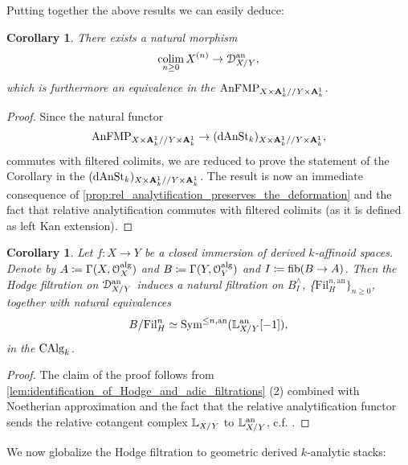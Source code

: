 \documentclass[10pt,a4paper,reqno]{amsart} %
\theoremstyle{plain}
\newtheorem{cor}[thm]{Corollary}
\theoremstyle{definition}
\theoremstyle{remark}
\numberwithin{equation}{section}
\begin{document}
Putting together the above results we can easily deduce:

\begin{cor} \label{cor:Hodge_filtration_in_the_non-archimedean_setting}
    There exists a natural morphism
        \[
            \operatorname*{colim}_{n \ge 0} X^{(n)} \to \mathcal D^\mathrm{an}_{X/ Y},  
        \]
    which is furthermore an equivalence in the \infcat $\mathrm{AnFMP}_{X \times \mathbf A^1_k/ /Y \times \mathbf A^1_k}$.
\end{cor}

\begin{proof}
    Since the natural functor
        \[
            \mathrm{AnFMP}_{X \times \mathbf A^1_k/ /Y \times \mathbf A^1_k} \to (\mathrm{dAnSt}_k)_{X \times \mathbf A^1_k/ /Y \times \mathbf A^1_k},
        \]
    commutes with filtered colimits, we are reduced to prove the statement of the Corollary in the \infcat $(\mathrm{dAnSt}_k)_{X \times \mathbf A^1_k/ /Y \times \mathbf A^1_k}$.
    The result is now an immediate consequence of \cref{prop:rel_analytification_preserves_the_deformation}
    and the fact that relative analytification commutes with filtered colimits (as it is defined as left Kan extension).
\end{proof}

\begin{cor}
    Let $f \colon X \to Y$ be a closed immersion of derived $k$-affinoid spaces. Denote by $A \coloneqq \Gamma(X, \mathcal O_X^\mathrm{alg})$
    and $B \coloneqq \Gamma(Y, \mathcal O_Y^\mathrm{alg})$ and $I \coloneqq \mathrm{fib}(B \to A)$. Then the Hodge filtration on $\mathcal D_{X/ Y}^\mathrm{an}$
    induces a natural filtration on $B^\wedge_I$, \{$\mathrm{Fil}_H^{n, \mathrm{an}} \}_{n \ge 0}$, together with natural equivalences
        \[
            B/ \mathrm{Fil}^n_H  \simeq \operatorname{Sym}^{\le n, \mathrm{an}}(\mathbb L_{X/ Y}^\mathrm{an}[-1]),  
        \]
    in the \infcat $\mathrm{CAlg}_k$.
\end{cor}

\begin{proof}
    The claim of the proof follows from \cref{lem:identification_of_Hodge_and_adic_filtrations} (2) combined with Noetherian approximation
    and the fact that the relative analytification functor sends the relative cotangent complex $\mathbb L_{X/ Y}$ to $\mathbb L_{X/ Y}^\mathrm{an}$, c.f. \cite[Theorem 5.21]{Porta_Yu_Representability}.
\end{proof}
We now globalize the Hodge filtration to geometric derived $k$-analytic stacks:
\end{document}
